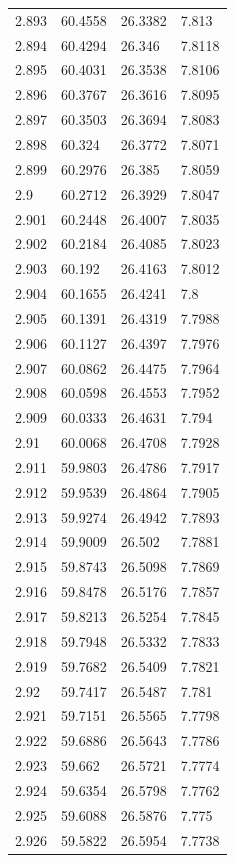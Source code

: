 \begin{tabular}{llll}
2.893 & 60.4558 & 26.3382 & 7.813 \\
2.894 & 60.4294 & 26.346 & 7.8118 \\
2.895 & 60.4031 & 26.3538 & 7.8106 \\
2.896 & 60.3767 & 26.3616 & 7.8095 \\
2.897 & 60.3503 & 26.3694 & 7.8083 \\
2.898 & 60.324 & 26.3772 & 7.8071 \\
2.899 & 60.2976 & 26.385 & 7.8059 \\
2.9 & 60.2712 & 26.3929 & 7.8047 \\
2.901 & 60.2448 & 26.4007 & 7.8035 \\
2.902 & 60.2184 & 26.4085 & 7.8023 \\
2.903 & 60.192 & 26.4163 & 7.8012 \\
2.904 & 60.1655 & 26.4241 & 7.8 \\
2.905 & 60.1391 & 26.4319 & 7.7988 \\
2.906 & 60.1127 & 26.4397 & 7.7976 \\
2.907 & 60.0862 & 26.4475 & 7.7964 \\
2.908 & 60.0598 & 26.4553 & 7.7952 \\
2.909 & 60.0333 & 26.4631 & 7.794 \\
2.91 & 60.0068 & 26.4708 & 7.7928 \\
2.911 & 59.9803 & 26.4786 & 7.7917 \\
2.912 & 59.9539 & 26.4864 & 7.7905 \\
2.913 & 59.9274 & 26.4942 & 7.7893 \\
2.914 & 59.9009 & 26.502 & 7.7881 \\
2.915 & 59.8743 & 26.5098 & 7.7869 \\
2.916 & 59.8478 & 26.5176 & 7.7857 \\
2.917 & 59.8213 & 26.5254 & 7.7845 \\
2.918 & 59.7948 & 26.5332 & 7.7833 \\
2.919 & 59.7682 & 26.5409 & 7.7821 \\
2.92 & 59.7417 & 26.5487 & 7.781 \\
2.921 & 59.7151 & 26.5565 & 7.7798 \\
2.922 & 59.6886 & 26.5643 & 7.7786 \\
2.923 & 59.662 & 26.5721 & 7.7774 \\
2.924 & 59.6354 & 26.5798 & 7.7762 \\
2.925 & 59.6088 & 26.5876 & 7.775 \\
2.926 & 59.5822 & 26.5954 & 7.7738 \\

\end{tabular}

